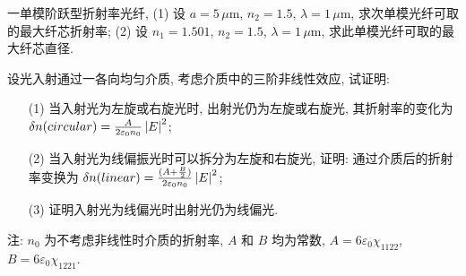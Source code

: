 \documentclass{assignment}
\begin{document}
\begin{prob}
    一单模阶跃型折射率光纤, (1) 设 $a=5\,\mu$m, $n_2=1.5$, $\lambda=1\,\mu$m, 求次单模光纤可取的最大纤芯折射率; (2) 设 $n_1=1.501$, $n_2=1.5$, $\lambda=1\,\mu$m, 求此单模光纤可取的最大纤芯直径.
\end{prob}
\begin{sol}
    
\end{sol}

\begin{prob}
    设光入射通过一各向均匀介质, 考虑介质中的三阶非线性效应, 试证明:
    \begin{itemize}
        \item[(1)] 当入射光为左旋或右旋光时, 出射光仍为左旋或右旋光, 其折射率的变化为 $\delta n(circular)=\frac{A}{2\varepsilon_0n_0}\left\lvert E\right\rvert^2$;
        \item[(2)] 当入射光为线偏振光时可以拆分为左旋和右旋光, 证明: 通过介质后的折射率变换为 $\delta n(linear)=\frac{(A+\frac{B}{2})}{2\varepsilon_0n_0}\left\lvert E\right\rvert^2$;
        \item[(3)] 证明入射光为线偏光时出射光仍为线偏光.
    \end{itemize}
    注: $n_0$ 为不考虑非线性时介质的折射率, $A$ 和 $B$ 均为常数, $A=6\varepsilon_0\chi_{1122}$, $B=6\varepsilon_0\chi_{1221}$.
\end{prob}
\begin{pf}

\end{pf}
\end{document}
